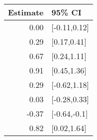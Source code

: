 \begin{tabular}{rl}
  \hline
Estimate & 95\% CI \\ 
  \hline
0.00 & [-0.11,0.12] \\ 
  0.29 & [0.17,0.41] \\ 
  0.67 & [0.24,1.11] \\ 
  0.91 & [0.45,1.36] \\ 
  0.29 & [-0.62,1.18] \\ 
  0.03 & [-0.28,0.33] \\ 
  -0.37 & [-0.64,-0.1] \\ 
  0.82 & [0.02,1.64] \\ 
   \hline
\end{tabular}

